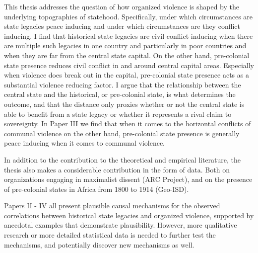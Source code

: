 This thesis addresses the question of how organized violence is shaped by the
underlying topographies of statehood. Specifically, under which circumstances
are state legacies peace inducing and under which circumstances are they
conflict inducing. I find that historical state legacies are civil conflict
inducing when there are multiple such legacies in one country and particularly
in poor countries and when they are far from the central state capital. On the
other hand, pre-colonial state presence reduces civil conflict in and around
central capital areas. Especially when violence does break out in the capital,
pre-colonial state presence acts as a substantial violence reducing factor. I
argue that the relationship between the central state and the historical, or
pre-colonial state, is what determines the outcome, and that the distance only
proxies whether or not the central state is able to benefit from a state legacy
or whether it represents a rival claim to sovereignty. In Paper III we find that
when it comes to the horizontal conflicts of communal violence on the other
hand, pre-colonial state presence is generally peace inducing when it comes to
communal violence.

In addition to the contribution to the theoretical and empirical literature, the
thesis also makes a considerable contribution in the form of data. Both on
organizations engaging in maximalist dissent (ARC Project), and on the presence
of pre-colonial states in Africa from 1800 to 1914 (Geo-ISD).

Papers II - IV all present plausible causal mechanisms for the observed
correlations between historical state legacies and organized violence, supported
by anecdotal examples that demonstrate plausibility. However, more qualitative
research or more detailed statistical data is needed to further test the
mechanisms, and potentially discover new mechanisms as well.

